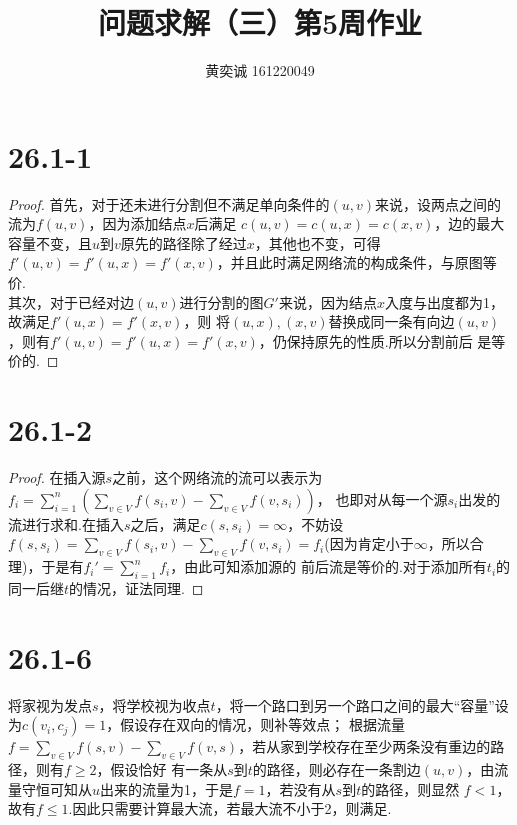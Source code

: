 \documentclass[twocolumn]{article}
\newenvironment{SChinese}{%
	\CJKfamily{gbsn}%
	\CJKtilde
	\CJKnospace}{}
\begin{document}
	\begin{CJK}{UTF8}{}	
		\begin{SChinese}	
			\title{问题求解（三）第5周作业}
			\author{黄奕诚 161220049}
			\maketitle
			
			\section*{26.1-1}
				\begin{proof}
					首先，对于还未进行分割但不满足单向条件的$(u,v)$来说，设两点之间的流为$f(u,v)$，因为添加结点$x$后满足
					$c(u,v)=c(u,x)=c(x,v)$，边的最大容量不变，且$u$到$v$原先的路径除了经过$x$，其他也不变，可得$f'(u,v)=
					f'(u,x)=f'(x,v)$，并且此时满足网络流的构成条件，与原图等价.\\
					其次，对于已经对边$(u,v)$进行分割的图$G'$来说，因为结点$x$入度与出度都为1，故满足$f'(u,x)=f'(x,v)$，则
					将$(u,x),(x,v)$替换成同一条有向边$(u,v)$，则有$f'(u,v)=f'(u,x)=f'(x,v)$，仍保持原先的性质.所以分割前后
					是等价的.
				\end{proof}
			\section*{26.1-2}
				\begin{proof}
					在插入源$s$之前，这个网络流的流可以表示为$f_i=\sum_{i=1}^{n}(\sum_{v\in V}^{}f(s_i,v)-\sum_{v\in V}^{}f(v,s_i))$，
					也即对从每一个源$s_i$出发的流进行求和.在插入$s$之后，满足$c(s,s_i)=\infty$，不妨设$f(s,s_i)=\sum_{v\in V}^{}
					f(s_i,v)-\sum_{v\in V}^{}f(v,s_i)=f_i$(因为肯定小于$\infty$，所以合理)，于是有$f_i'=\sum_{i=1}^{n}f_i$，由此可知添加源的
					前后流是等价的.对于添加所有$t_i$的同一后继$t$的情况，证法同理.
				\end{proof}
			\section*{26.1-6}
				将家视为发点$s$，将学校视为收点$t$，将一个路口到另一个路口之间的最大“容量”设为$c(v_i,c_j)=1$，假设存在双向的情况，则补等效点；
				根据流量$f=\sum_{v\in V}^{}f(s,v)-\sum_{v\in V}^{}f(v,s)$，若从家到学校存在至少两条没有重边的路径，则有$f\ge2$，假设恰好
				有一条从$s$到$t$的路径，则必存在一条割边$(u,v)$，由流量守恒可知从$u$出来的流量为1，于是$f=1$，若没有从$s$到$t$的路径，则显然
				$f<1$，故有$f\le1$.因此只需要计算最大流，若最大流不小于2，则满足.

\end{SChinese}
\end{CJK}
\end{document}
